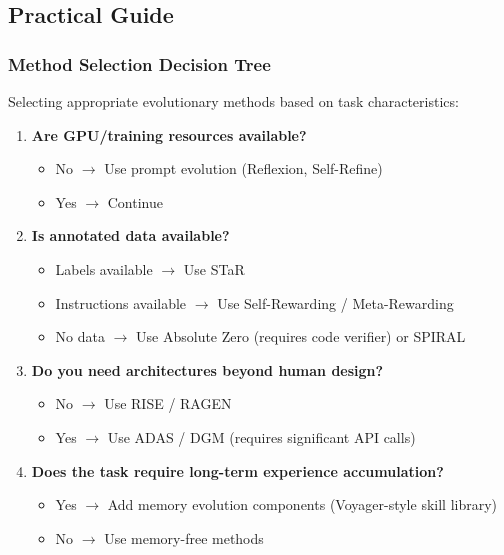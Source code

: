 \subsection{Practical Guide}\label{sec:ch3-practice}

\subsubsection{Method Selection Decision Tree}

Selecting appropriate evolutionary methods based on task characteristics:

\begin{enumerate}
\item \textbf{Are GPU/training resources available?}
\begin{itemize}
\item No $\rightarrow$ Use prompt evolution (Reflexion, Self-Refine)
\item Yes $\rightarrow$ Continue
\end{itemize}

\item \textbf{Is annotated data available?}
\begin{itemize}
\item Labels available $\rightarrow$ Use STaR
\item Instructions available $\rightarrow$ Use Self-Rewarding / Meta-Rewarding
\item No data $\rightarrow$ Use Absolute Zero (requires code verifier) or SPIRAL
\end{itemize}

\item \textbf{Do you need architectures beyond human design?}
\begin{itemize}
\item No $\rightarrow$ Use RISE / RAGEN
\item Yes $\rightarrow$ Use ADAS / DGM (requires significant API calls)
\end{itemize}

\item \textbf{Does the task require long-term experience accumulation?}
\begin{itemize}
\item Yes $\rightarrow$ Add memory evolution components (Voyager-style skill library)
\item No $\rightarrow$ Use memory-free methods
\end{itemize}
\end{enumerate}

